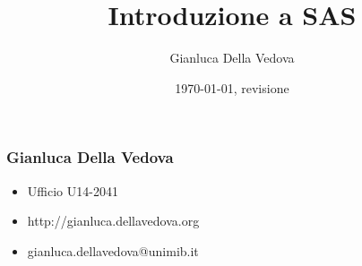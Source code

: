 \usepackage[italian]{babel}
\usepackage[utf8]{inputenc}
\usepackage{pgf}
\usepackage{verbatim}

\usepackage[T1]{fontenc}

\immediate{}


\author{Gianluca Della Vedova}
\title{Introduzione a SAS}
\date{\today, {\tiny revisione \VCRevision}}






\begin{frame}
  \titlepage
\end{frame}


\begin{frame}\frametitle{Gianluca Della Vedova}
  \begin{itemize}
  \item
    Ufficio U14-2041
  \item
    \textsf{\small http://gianluca.dellavedova.org}
  \item
    \textsf{\small gianluca.dellavedova@unimib.it}
  \end{itemize}
\end{frame}





